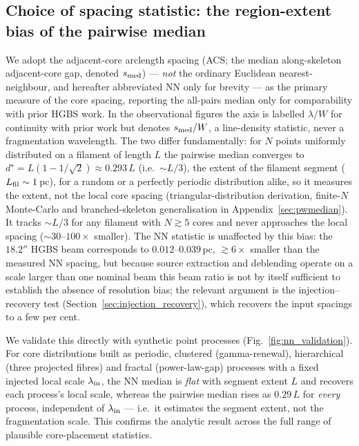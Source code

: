 \documentclass[usenatbib,twoside,twocolumn]{mnras}
\begin{document}
\subsection{Choice of spacing statistic: the region-extent bias of the pairwise median}
\label{sec:statistics}

We adopt the adjacent-core arclength spacing (ACS; the median along-skeleton adjacent-core gap, denoted $s_{\rm med}$) --- \emph{not} the ordinary Euclidean nearest-neighbour, and hereafter abbreviated NN only for brevity --- as the primary measure of the core spacing, reporting the all-pairs median only for comparability with prior HGBS work. In the observational figures the axis is labelled $\lambda/W$ for continuity with prior work but denotes $s_{\rm med}/W$, a line-density statistic, never a fragmentation wavelength. The two differ fundamentally: for $N$ points uniformly distributed on a filament of length $L$ the pairwise median converges to $d^\star=L(1-1/\sqrt{2})\approx0.293\,L$ (i.e.\ $\sim L/3$), the extent of the filament segment ($L_{\rm fil}\sim1$\,pc), for a random or a perfectly periodic distribution alike, so it measures the extent, not the local core spacing (triangular-distribution derivation, finite-$N$ Monte-Carlo and branched-skeleton generalisation in Appendix~\ref{sec:pwmedian}). It tracks $\sim L/3$ for any filament with $N\gtrsim5$ cores and never approaches the local spacing ($\sim30$--$100\times$ smaller). The NN statistic is unaffected by this bias: the $18.2''$ HGBS beam corresponds to $0.012$--$0.039$\,pc, $\gtrsim6\times$ smaller than the measured NN spacing, but because source extraction and deblending operate on a scale larger than one nominal beam this beam ratio is not by itself sufficient to establish the absence of resolution bias; the relevant argument is the injection--recovery test (Section~\ref{sec:injection_recovery}), which recovers the input spacings to a few per cent.

We validate this directly with synthetic point processes (Fig.~\ref{fig:nn_validation}). For core distributions built as periodic, clustered (gamma-renewal), hierarchical (three projected fibres) and fractal (power-law-gap) processes with a fixed injected local scale $\lambda_{\rm in}$, the NN median is \emph{flat} with segment extent $L$ and recovers each process's local scale, whereas the pairwise median rises as $0.29\,L$ for \emph{every} process, independent of $\lambda_{\rm in}$ --- i.e.\ it estimates the segment extent, not the fragmentation scale. This confirms the analytic result across the full range of plausible core-placement statistics.
\end{document}
